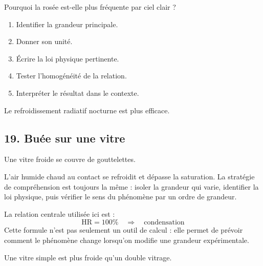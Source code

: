 \documentclass[11pt,a4paper]{article}
\begin{document}
\begin{exercicebox}
Pourquoi la rosée est-elle plus fréquente par ciel clair ?
\begin{enumerate}
  \item Identifier la grandeur principale.
  \item Donner son unité.
  \item Écrire la loi physique pertinente.
  \item Tester l'homogénéité de la relation.
  \item Interpréter le résultat dans le contexte.
\end{enumerate}
\end{exercicebox}

\begin{corrigebox}[Indication]
Le refroidissement radiatif nocturne est plus efficace.
\end{corrigebox}


\subsection{19. Buée sur une vitre}

\begin{exemplebox}
Une vitre froide se couvre de gouttelettes.
\end{exemplebox}

\begin{methodebox}
L'air humide chaud au contact se refroidit et dépasse la saturation.
La stratégie de compréhension est toujours la même : isoler la grandeur qui varie, identifier la loi physique, puis vérifier le sens du phénomène par un ordre de grandeur.
\end{methodebox}

\begin{theorembox}
La relation centrale utilisée ici est :
\[
\mathrm{HR}=100\%\quad\Rightarrow\quad \text{condensation}
\]
Cette formule n'est pas seulement un outil de calcul : elle permet de prévoir comment le phénomène change lorsqu'on modifie une grandeur expérimentale.
\end{theorembox}

\begin{odgbox}
Une vitre simple est plus froide qu'un double vitrage.
\end{odgbox}
\end{document}
